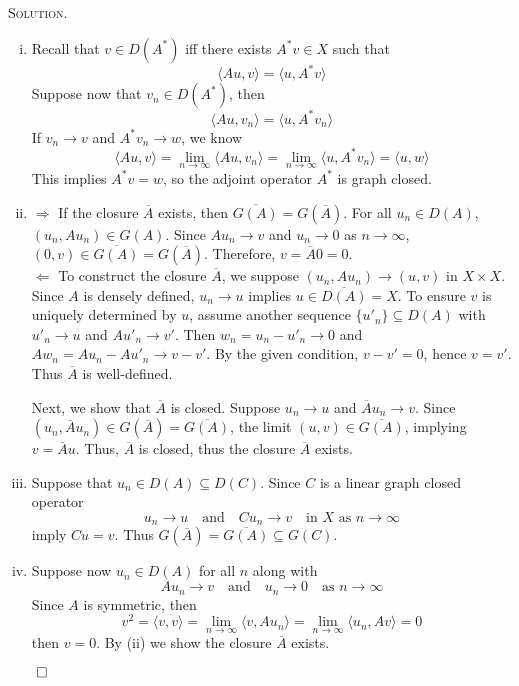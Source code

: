 \documentclass[12pt, a4paper, oneside]{ctexart}
\newenvironment{solution}{%
	\par\noindent\textsc{Solution. }\ignorespaces
}{%
	\hfill$\qed$\par
}
\begin{document}
	\begin{solution}
		\begin{enumerate}[(i)]
			\item Recall that $v\in D(A^{*})$ iff there exists $A^{*}v\in X$ such that \[ \langle Au,v\rangle = \langle u, A^{*}v \rangle \]Suppose now that $v_{n}\in D(A^{*})$, then\[ \langle Au,v_{n}\rangle = \langle u, A^{*}v_{n} \rangle \]If $v_{n}\to v$ and $A^{*}v_{n}\to w$, we know\[ \langle Au,v\rangle = \lim\limits_{n\to\infty}\langle Au,v_{n} \rangle =\lim\limits_{n\to\infty}\langle u,A^{*}v_{n}\rangle = \langle u,w\rangle \] This implies $ A^{*}v = w$, so the adjoint operator $A^{*}$ is graph closed.
			\item $\Rightarrow$ If the closure $\overline{A}$ exists, then $\overline{G(A)} = G(\overline{A})$. For all $u_{n}\in D(A)$, $(u_{n}, Au_{n})\in G(A)$. Since $Au_{n}\to v$ and $u_{n}\to0$ as $n\to\infty$, $(0, v)\in\overline{G(A)} = G(\overline{A})$. Therefore, $v = \overline{A}0 = 0$.\\
			$\Leftarrow$ To construct the closure \( \overline{A} \), we suppose \( (u_n, Au_n) \to (u, v) \) in \( X \times X \). Since \( A \) is densely defined, \( u_n \to u \) implies \( u \in \overline{D(A)} = X \). To ensure \( v \) is uniquely determined by \( u \), assume another sequence \( \{u'_n\} \subseteq D(A) \) with \( u'_n \to u \) and \( Au'_n \to v' \). Then \( w_n = u_n - u'_n \to 0 \) and \( Aw_n = Au_n - Au'_n \to v - v' \). By the given condition, \( v - v' = 0 \), hence \( v = v' \). Thus $\overline{A}$ is well-defined.
			
			Next, we show that \( \overline{A} \) is closed. Suppose \( u_n \to u \) and \( \overline{A}u_n \to v \). Since \( (u_n, \overline{A}u_n) \in G(\overline{A}) = \overline{G(A)} \), the limit \( (u, v) \in \overline{G(A)} \), implying \( v = \overline{A}u \). Thus, \( \overline{A} \) is closed, thus the closure \( \overline{A} \) exists.

			\item Suppose that $u_{n}\in D(A)\subseteq D(C)$. Since $C$ is a linear graph closed operator 	\[
			u_n \to u \quad \text{and} \quad Cu_n \to v \quad \text{in } X \text{ as } n \to \infty
			\]
			imply $Cu = v$. Thus $G(\overline{A}) = \overline{G(A)}\subseteq G(C)$.
			\item Suppose now $u_{n}\in D(A)$ for all $n$ along with \[
			Au_n \to v \quad \text{and} \quad u_n \to 0 \quad \text{as } n \to \infty
			\]Since $A$ is symmetric, then \[ v^{2} = \langle v,v\rangle = \lim\limits_{n\to\infty}\langle v, Au_{n}\rangle = \lim\limits_{n\to\infty}\langle u_{n}, Av\rangle = 0 \]then $v=0$. By (ii) we show the closure $\overline{A}$ exists.
			

\end{enumerate}
\end{solution}
\end{document}

